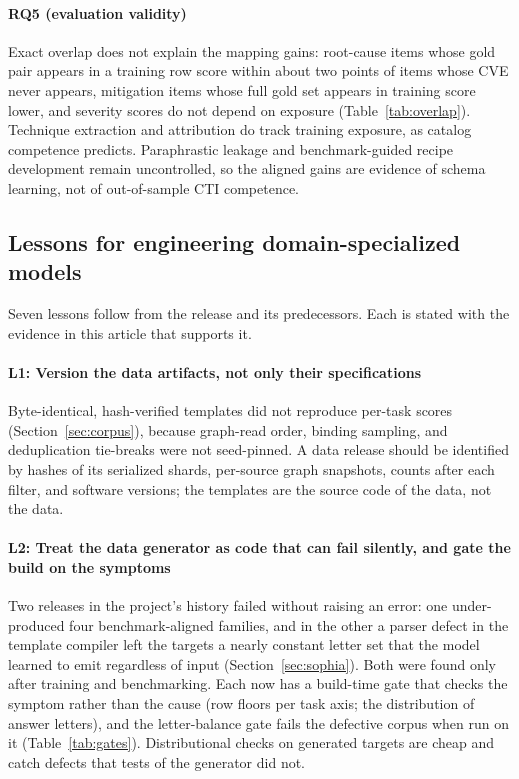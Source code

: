 \documentclass[a4paper,fleqn]{cas-dc}
\begin{document}
\paragraph{RQ5 (evaluation validity)}
Exact overlap does not explain the mapping gains: root-cause items whose gold pair appears in a training row score within about two points of items whose CVE never appears, mitigation items whose full gold set appears in training score lower, and severity scores do not depend on exposure (Table~\ref{tab:overlap}). Technique extraction and attribution do track training exposure, as catalog competence predicts. Paraphrastic leakage and benchmark-guided recipe development remain uncontrolled, so the aligned gains are evidence of schema learning, not of out-of-sample CTI competence.

\subsection{Lessons for engineering domain-specialized models}\label{sec:lessons}
Seven lessons follow from the release and its predecessors. Each is stated with the evidence in this article that supports it.

\paragraph{L1: Version the data artifacts, not only their specifications}
Byte-identical, hash-verified templates did not reproduce per-task scores (Section~\ref{sec:corpus}), because graph-read order, binding sampling, and deduplication tie-breaks were not seed-pinned. A data release should be identified by hashes of its serialized shards, per-source graph snapshots, counts after each filter, and software versions; the templates are the source code of the data, not the data.

\paragraph{L2: Treat the data generator as code that can fail silently, and gate the build on the symptoms}
Two releases in the project's history failed without raising an error: one under-produced four benchmark-aligned families, and in the other a parser defect in the template compiler left the targets a nearly constant letter set that the model learned to emit regardless of input (Section~\ref{sec:sophia}). Both were found only after training and benchmarking. Each now has a build-time gate that checks the symptom rather than the cause (row floors per task axis; the distribution of answer letters), and the letter-balance gate fails the defective corpus when run on it (Table~\ref{tab:gates}). Distributional checks on generated targets are cheap and catch defects that tests of the generator did not.
\end{document}

